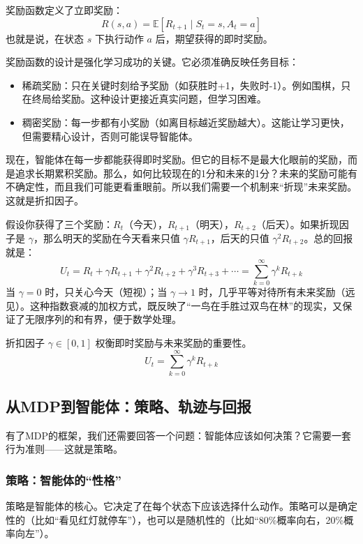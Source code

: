 \documentclass[lang=cn,zihao=-4,a4paper,fontset=windows]{beautybook}
\begin{document}
\begin{definition}[][奖励函数 $R$]
奖励函数定义了立即奖励：
\[
R(s, a) = \mathbb{E}[R_{t+1} \mid S_t = s, A_t = a]
\]
也就是说，在状态 $s$ 下执行动作 $a$ 后，期望获得的即时奖励。
\end{definition}
奖励函数的设计是强化学习成功的关键。它必须准确反映任务目标：
\begin{itemize}
    \item 稀疏奖励：只在关键时刻给予奖励（如获胜时+1，失败时-1）。例如围棋，只在终局给奖励。这种设计更接近真实问题，但学习困难。
    \item 稠密奖励：每一步都有小奖励（如离目标越近奖励越大）。这能让学习更快，但需要精心设计，否则可能误导智能体。
\end{itemize}
现在，智能体在每一步都能获得即时奖励。但它的目标不是最大化眼前的奖励，而是追求长期累积奖励。那么，如何比较现在的1分和未来的1分？未来的奖励可能有不确定性，而且我们可能更看重眼前。所以我们需要一个机制来“折现”未来奖励。这就是折扣因子。

假设你获得了三个奖励：$R_t$（今天），$R_{t+1}$（明天），$R_{t+2}$（后天）。如果折现因子是 $\gamma$，那么明天的奖励在今天看来只值 $\gamma R_{t+1}$，后天的只值 $\gamma^2 R_{t+2}$。总的回报就是：
\[
U_t = R_t + \gamma R_{t+1} + \gamma^2 R_{t+2} + \gamma^3 R_{t+3} + \cdots = \sum_{k=0}^{\infty} \gamma^k R_{t+k}
\]
当 $\gamma = 0$ 时，只关心今天（短视）；当 $\gamma \rightarrow 1$ 时，几乎平等对待所有未来奖励（远见）。这种指数衰减的加权方式，既反映了“一鸟在手胜过双鸟在林”的现实，又保证了无限序列的和有界，便于数学处理。

\begin{definition}
折扣因子 $\gamma \in [0, 1]$ 权衡即时奖励与未来奖励的重要性。
\[
U_t = \sum_{k=0}^{\infty} \gamma^k R_{t+k}
\]
\end{definition}

\subsection{从MDP到智能体：策略、轨迹与回报}

有了MDP的框架，我们还需要回答一个问题：智能体应该如何决策？它需要一套行为准则——这就是策略。

\subsubsection{策略：智能体的“性格”}

策略是智能体的核心。它决定了在每个状态下应该选择什么动作。策略可以是确定性的（比如“看见红灯就停车”），也可以是随机性的（比如“80\%概率向右，20\%概率向左”）。
\end{document}
